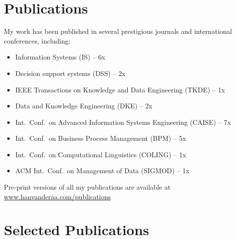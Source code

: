 \section{Publications}
\noindent My work has been published in several prestigious journals and international conferences, including: 
\begin{itemize}
	\itemsep-0.2em
	
	\item Information Systems  (IS) -- 6x
	
	\item Decision support systems (DSS) -- 2x
	
	\item IEEE Transactions on Knowledge and Data Engineering (TKDE) -- 1x
	
	\item Data and Knowledge Engineering  (DKE) -- 2x
	
	\item Int.\ Conf.\ on Advanced Information Systems Engineering (CAISE)	 -- 7x
	
	\item Int.\ Conf.\ on Business Process Management (BPM) --  5x

	\item Int.\ Conf.\ on Computational Linguistics (COLING) -- 1x
	
	\item ACM Int.\ Conf.\ on Management of Data (SIGMOD) -- 1x 
	
	
\end{itemize}
\smallskip
Pre-print versions of all my publications are available at \href{https://www.hanvanderaa.com/publications}{www.hanvanderaa.com/publications}\\

%

\section{Selected Publications}

